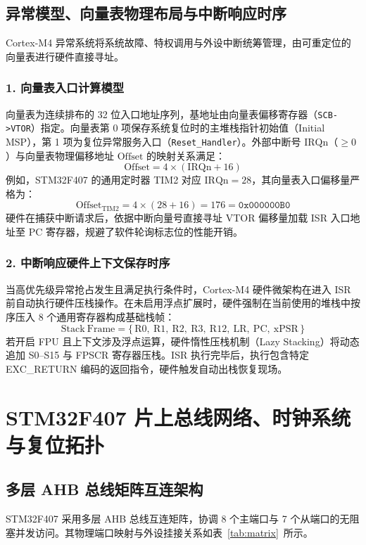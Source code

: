 \documentclass[11pt,a4paper]{ctexart}
\begin{document}
\subsection{异常模型、向量表物理布局与中断响应时序}
Cortex-M4 异常系统将系统故障、特权调用与外设中断统筹管理，由可重定位的向量表进行硬件直接寻址。

\subsubsection*{1. 向量表入口计算模型}
向量表为连续排布的 32 位入口地址序列，基地址由向量表偏移寄存器（\texttt{SCB->VTOR}）指定。向量表第 0 项保存系统复位时的主堆栈指针初始值（Initial MSP），第 1 项为复位异常服务入口（\texttt{Reset\_Handler}）。外部中断号 $\mathrm{IRQn}$（$\ge 0$）与向量表物理偏移地址 $\mathrm{Offset}$ 的映射关系满足：
\begin{equation}
\mathrm{Offset} = 4 \times (\mathrm{IRQn} + 16)
\end{equation}
例如，STM32F407 的通用定时器 TIM2 对应 $\mathrm{IRQn}=28$，其向量表入口偏移量严格为：
\begin{equation}
\mathrm{Offset}_{\mathrm{TIM2}} = 4 \times (28+16) = 176 = \texttt{0x000000B0}
\end{equation}
硬件在捕获中断请求后，依据中断向量号直接寻址 VTOR 偏移量加载 ISR 入口地址至 PC 寄存器，规避了软件轮询标志位的性能开销。

\subsubsection*{2. 中断响应硬件上下文保存时序}
当高优先级异常抢占发生且满足执行条件时，Cortex-M4 硬件微架构在进入 ISR 前自动执行硬件压栈操作。在未启用浮点扩展时，硬件强制在当前使用的堆栈中按序压入 8 个通用寄存器构成基础栈帧：
\begin{equation}
\mathrm{Stack\ Frame} = \{\,\mathrm{R0,\ R1,\ R2,\ R3,\ R12,\ LR,\ PC,\ xPSR}\,\}
\end{equation}
若开启 FPU 且上下文涉及浮点运算，硬件惰性压栈机制（Lazy Stacking）将动态追加 S0--S15 与 FPSCR 寄存器压栈。ISR 执行完毕后，执行包含特定 EXC\_RETURN 编码的返回指令，硬件触发自动出栈恢复现场。

\section{STM32F407 片上总线网络、时钟系统与复位拓扑}

\subsection{多层 AHB 总线矩阵互连架构}
STM32F407 采用多层 AHB 总线互连矩阵，协调 8 个主端口与 7 个从端口的无阻塞并发访问。其物理端口映射与外设挂接关系如表~\ref{tab:matrix}~所示。
\end{document}
